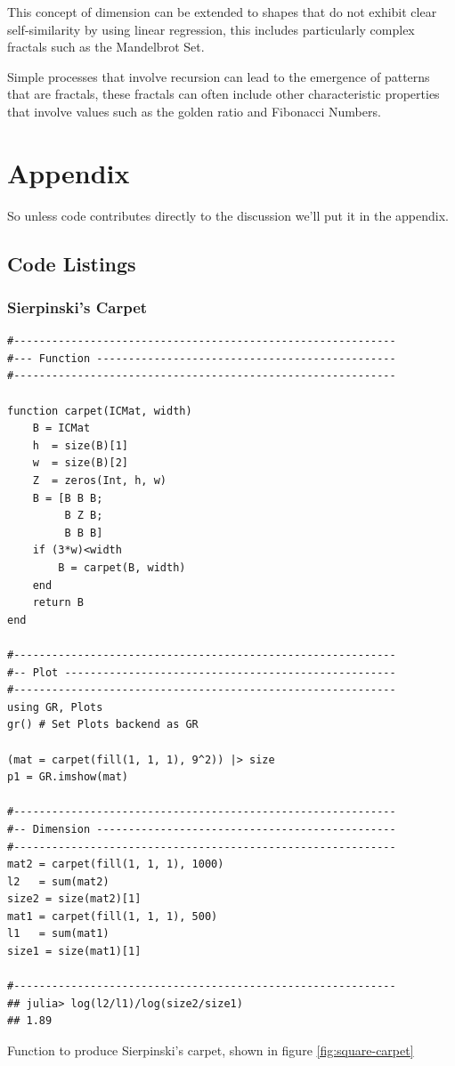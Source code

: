 \documentclass[a4paper,11pt,twoside]{article}
\begin{document}
This concept of dimension can be extended to shapes that do not exhibit clear self-similarity by using linear regression, this includes particularly complex fractals such as the Mandelbrot Set.

Simple processes that involve recursion can lead to the emergence of patterns that are fractals, these fractals can often include other characteristic properties that involve values such as the golden ratio and Fibonacci Numbers.

 \appendix 
\section{Appendix}
\label{appendix}
So unless code contributes directly to the discussion we'll put it in the appendix.
\subsection{Code Listings}
\label{sec:org90b7e67}
\subsubsection{Sierpinski's Carpet}
\label{sec:orgd08ffb6}


\begin{listing}[htbp]
\begin{verbatim}
#------------------------------------------------------------
#--- Function -----------------------------------------------
#------------------------------------------------------------

function carpet(ICMat, width)
    B = ICMat
    h  = size(B)[1]
    w  = size(B)[2]
    Z  = zeros(Int, h, w)
    B = [B B B;
         B Z B;
         B B B]
    if (3*w)<width
        B = carpet(B, width)
    end
    return B
end

#------------------------------------------------------------
#-- Plot ----------------------------------------------------
#------------------------------------------------------------
using GR, Plots
gr() # Set Plots backend as GR

(mat = carpet(fill(1, 1, 1), 9^2)) |> size
p1 = GR.imshow(mat)

#------------------------------------------------------------
#-- Dimension -----------------------------------------------
#------------------------------------------------------------
mat2 = carpet(fill(1, 1, 1), 1000)
l2   = sum(mat2)
size2 = size(mat2)[1]
mat1 = carpet(fill(1, 1, 1), 500)
l1   = sum(mat1)
size1 = size(mat1)[1]

#------------------------------------------------------------
## julia> log(l2/l1)/log(size2/size1)
## 1.89
\end{verbatim}
\caption{\label{l-s-carpet}Function to produce Sierpinski's carpet, shown in figure \ref{fig:square-carpet}}
\end{listing}
\end{document}
